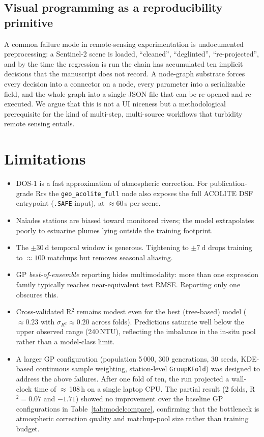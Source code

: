 \documentclass[11pt,a4paper]{article}
\begin{document}
\subsection{Visual programming as a reproducibility primitive}
A common failure mode in remote-sensing experimentation is undocumented preprocessing: a Sentinel-2 scene is loaded, ``cleaned'', ``deglinted'', ``re-projected'', and by the time the regression is run the chain has accumulated ten implicit decisions that the manuscript does not record. A node-graph substrate forces every decision into a connector on a node, every parameter into a serializable field, and the whole graph into a single JSON file that can be re-opened and re-executed. We argue that this is not a UI niceness but a methodological prerequisite for the kind of multi-step, multi-source workflows that turbidity remote sensing entails.

\section{Limitations}
\label{sec:limit}
\begin{itemize}
    \item DOS-1 is a fast approximation of atmospheric correction. For publication-grade Rrs the \texttt{geo\_acolite\_full} node also exposes the full ACOLITE DSF entrypoint (\texttt{.SAFE} input), at $\approx$60\,s per scene.
    \item Naïades stations are biased toward monitored rivers; the model extrapolates poorly to estuarine plumes lying outside the training footprint.
    \item The $\pm\SI{30}{\day}$ temporal window is generous. Tightening to $\pm\SI{7}{\day}$ drops training to $\approx 100$ matchups but removes seasonal aliasing.
    \item GP \emph{best-of-ensemble} reporting hides multimodality: more than one expression family typically reaches near-equivalent test RMSE. Reporting only one obscures this.
    \item Cross-validated R$^2$ remains modest even for the best (tree-based) model ($\approx 0.23$ with $\sigma_{R^2} \approx 0.20$ across folds). Predictions saturate well below the upper observed range (240\,NTU), reflecting the imbalance in the in-situ pool rather than a model-class limit.
    \item A larger GP configuration (population 5\,000, 300 generations, 30 seeds, KDE-based continuous sample weighting, station-level \texttt{GroupKFold}) was designed to address the above failures. After one fold of ten, the run projected a wall-clock time of $\approx$\,108\,h on a single laptop CPU. The partial result (2 folds, R$^2 = 0.07$ and $-1.71$) showed no improvement over the baseline GP configurations in Table~\ref{tab:modelcompare}, confirming that the bottleneck is atmospheric correction quality and matchup-pool size rather than training budget.
\end{itemize}
\end{document}

